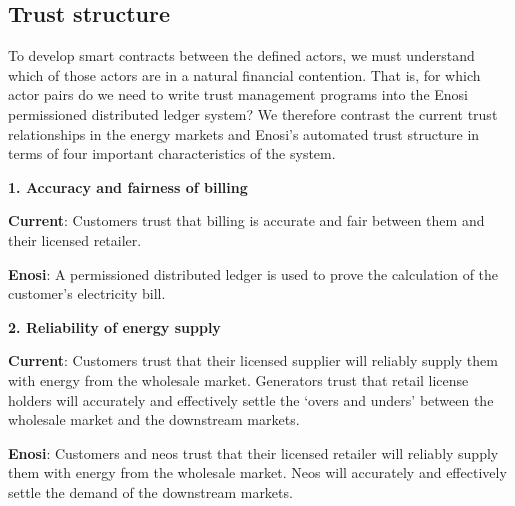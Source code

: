 \documentclass[a4paper,12pt,reqno]{amsart}
\theoremstyle{definition}
\begin{document}
\subsection*{Trust structure}

To develop smart contracts between the defined actors, we must understand which of those actors are in a natural financial contention. That is, for which actor pairs do we need to write trust management programs into the Enosi permissioned distributed ledger system? We therefore contrast the current trust relationships in the energy markets and Enosi's automated trust structure in terms of four important characteristics of the system. 

\vspace{+1.5em}

\begin{mdframed}
\centering
\textbf{1. Accuracy and fairness of billing}
\end{mdframed}

\begin{mdframed}

\noindent \textbf{Current}: Customers trust that billing is accurate and fair between them and their licensed retailer. 

\noindent \textbf{Enosi}: A permissioned distributed ledger is used to prove the calculation of the customer’s electricity bill.

\end{mdframed}
\vspace{+1.5em}

\begin{mdframed}
\centering
\textbf{2. Reliability of energy supply}
\end{mdframed}
\begin{mdframed}

\noindent \textbf{Current}: Customers trust that their licensed supplier will reliably supply them with energy from the wholesale market. Generators trust that retail license holders will accurately and effectively settle the `overs and unders' between the wholesale market and the downstream markets.

\noindent \textbf{Enosi}: Customers and neos trust that their licensed retailer will reliably supply them with energy from the wholesale market. Neos will accurately and effectively settle the demand of the downstream markets.

\end{mdframed}
\vspace{+1.5em}
\end{document}
